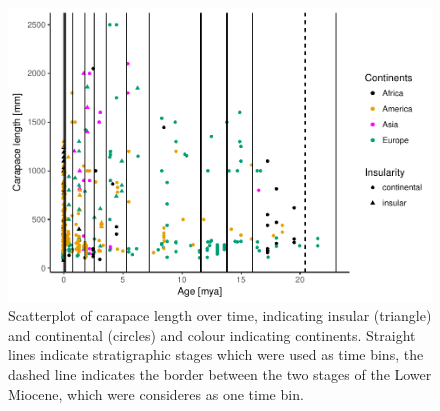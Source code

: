 


\begin{figure}[htbp]
	\centering
	\includegraphics[width=\textwidth]{MA_JJ_files/figure-latex/overviewData-1.pdf}
	\caption[Carapace length over time]{Scatterplot of carapace length over time, indicating insular
		(triangle) and continental (circles) and colour indicating continents.
		Straight lines indicate stratigraphic stages which were used as time bins, the
		dashed line indicates the border between the two stages of the Lower Miocene,
		which were consideres as one time bin.}
	\label{fig:bins}
\end{figure}


